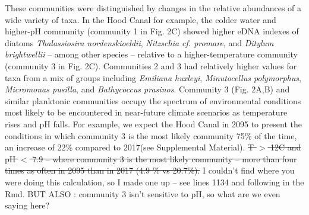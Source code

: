 \documentclass[11pt]{article}
\begin{document}
\begin{linenumbers}
These communities were distinguished by changes in the relative abundances of a wide variety of taxa. In the Hood Canal for example, the colder water and higher-pH community (community 1 in Fig. 2C) showed higher eDNA indexes of diatoms \textit{Thalassiosira nordenskioeldii}, \textit{Nitzschia cf. promare}, and \textit{Ditylum brightwellii} -- among other species -- relative to a higher-temperature community (community 3 in Fig. 2C). Communities 2 and 3 had relatively higher values for taxa from a mix of groups including \textit{Emiliana huxleyi}, \textit{Minutocellus polymorphus}, \textit{Micromonas pusilla}, and \textit{Bathycoccus prasinos}. Community 3 (Fig. 2A,B) and similar planktonic communities occupy the spectrum of environmental conditions most likely to be encountered in near-future climate scenarios as temperature rises and pH falls. For example, we expect the Hood Canal {\color{red} in 2095 to present the conditions in which community 3 is the most likely community 75\% of the time, an increase of 22\% compared to 2017(see Supplemental Material).} \st{T $>$ 12\degree C and pH $<$ {7.9} -- where community 3 is the most likely community -- more than four times as often in 2095 than in 2017 (4.9 \% vs 20.7\%).} {\color{blue} I couldn't find where you were doing this calculation, so I made one up -- see lines 1134 and following in the Rmd. BUT ALSO : community 3 isn't sensitive to pH, so what are we even saying here?}







\end{linenumbers}
\end{document}

